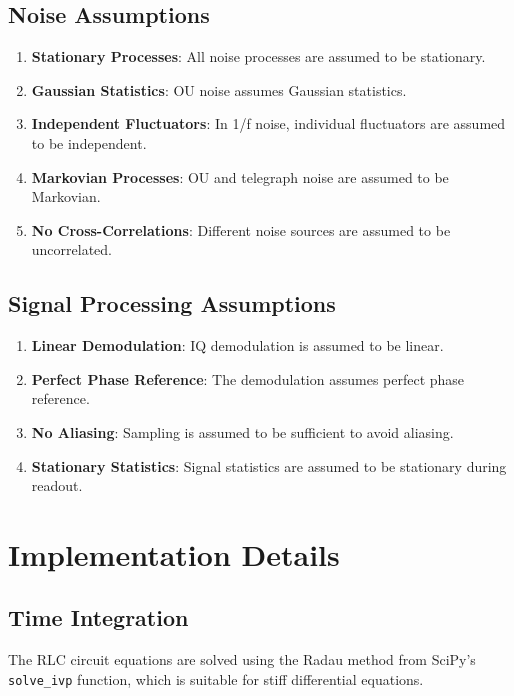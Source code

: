 \documentclass[11pt,a4paper]{article}
\begin{document}
\subsection{Noise Assumptions}

\begin{enumerate}
\item \textbf{Stationary Processes}: All noise processes are assumed to be stationary.
\item \textbf{Gaussian Statistics}: OU noise assumes Gaussian statistics.
\item \textbf{Independent Fluctuators}: In 1/f noise, individual fluctuators are assumed to be independent.
\item \textbf{Markovian Processes}: OU and telegraph noise are assumed to be Markovian.
\item \textbf{No Cross-Correlations}: Different noise sources are assumed to be uncorrelated.
\end{enumerate}

\subsection{Signal Processing Assumptions}

\begin{enumerate}
\item \textbf{Linear Demodulation}: IQ demodulation is assumed to be linear.
\item \textbf{Perfect Phase Reference}: The demodulation assumes perfect phase reference.
\item \textbf{No Aliasing}: Sampling is assumed to be sufficient to avoid aliasing.
\item \textbf{Stationary Statistics}: Signal statistics are assumed to be stationary during readout.
\end{enumerate}

\section{Implementation Details}

\subsection{Time Integration}

The RLC circuit equations are solved using the Radau method from SciPy's \texttt{solve\_ivp} function, which is suitable for stiff differential equations.
\end{document}

